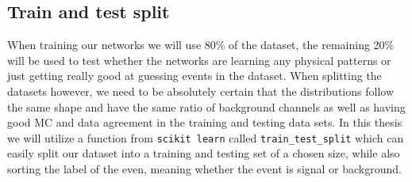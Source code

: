 \documentclass[12pt, a4paper]{book}
\begin{document}
\subsection{Train and test split}\label{sec:train_test}
When training our networks we will use 80\% of the dataset, the remaining 20\% will be used to test whether the networks are learning any physical patterns or just getting really good at guessing events in the dataset. When splitting the datasets however, we need to be absolutely certain that the distributions 
follow the same shape and have the same ratio of background channels as well as having good MC and data agreement in the training and testing data sets. In this thesis we will utilize a function from \verb|scikit learn| \cite{scikit-learn} called \verb|train_test_split| which can easily split our dataset into 
a training and testing set of a chosen size, while also sorting the label of the even, meaning whether the event is signal or background. 
\graphicspath{{../../../Plots/Data_Analysis/train_test_split/}}
\end{document}
